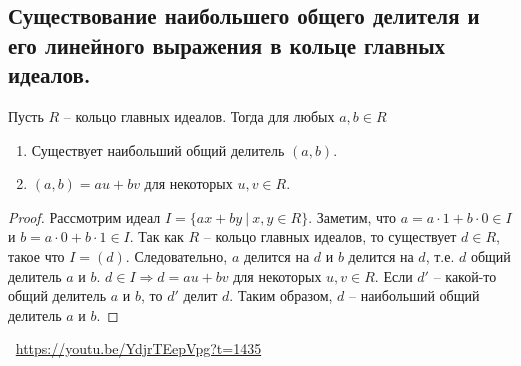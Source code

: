 \subsection{Существование наибольшего общего делителя и его линейного выражения в кольце главных идеалов.}
\begin{theorem}
    Пусть $R$ -- кольцо главных идеалов. Тогда для любых $a, b \in R$
    \begin{enumerate}
        \item Существует наибольший общий делитель $(a, b)$.
        \item $(a, b) = au + bv$ для некоторых $u, v \in R$.
    \end{enumerate}
    \begin{proof}
        Рассмотрим идеал $I = \{ ax + by \> | \> x, y \in R \}$. Заметим, что $a = a \cdot 1 + b \cdot 0 \in I$ и $b = a \cdot 0 + b \cdot 1 \in I$. Так как $R$ -- кольцо главных идеалов, то существует $d \in R$, такое что $I = (d)$. Следовательно, $a$ делится на $d$ и $b$ делится на $d$, т.е. $d$ общий делитель $a$ и $b$. $d \in I \Rightarrow d = au + bv$ для некоторых $u, v \in R$. Если $d'$ -- какой-то общий делитель $a$ и $b$, то $d'$ делит $d$. Таким образом, $d$ -- наибольший общий делитель $a$ и $b$.
    \end{proof}
\end{theorem}
\large \faYoutube \normalsize $\>$ \url{https://youtu.be/YdjrTEepVpg?t=1435}
